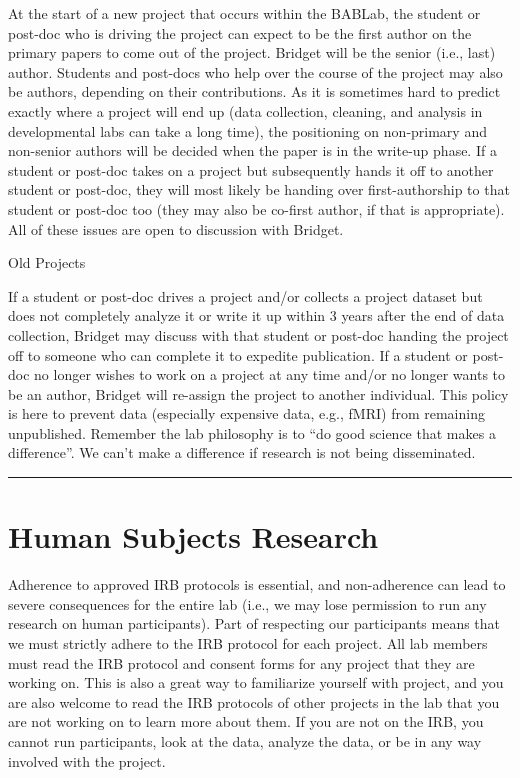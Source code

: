 \documentclass[]{book}
\begin{document}
At the start of a new project that occurs within the BABLab, the student or post-doc who is driving the project can expect to be the first author on the primary papers to come out of the project. Bridget will be the senior (i.e., last) author. Students and post-docs who help over the course of the project may also be authors, depending on their contributions. As it is sometimes hard to predict exactly where a project will end up (data collection, cleaning, and analysis in developmental labs can take a long time), the positioning on non-primary and non-senior authors will be decided when the paper is in the write-up phase. If a student or post-doc takes on a project but subsequently hands it off to another student or post-doc, they will most likely be handing over first-authorship to that student or post-doc too (they may also be co-first author, if that is appropriate). All of these issues are open to discussion with Bridget.

Old Projects

If a student or post-doc drives a project and/or collects a project dataset but does not completely analyze it or write it up within 3 years after the end of data collection, Bridget may discuss with that student or post-doc handing the project off to someone who can complete it to expedite publication. If a student or post-doc no longer wishes to work on a project at any time and/or no longer wants to be an author, Bridget will re-assign the project to another individual. This policy is here to prevent data (especially expensive data, e.g., fMRI) from remaining unpublished. Remember the lab philosophy is to ``do good science that makes a difference''. We can't make a difference if research is not being disseminated.

\begin{center}\rule{0.5\linewidth}{0.5pt}\end{center}

\hypertarget{human-subjects-research}{%
\section{Human Subjects Research}\label{human-subjects-research}}

Adherence to approved IRB protocols is essential, and non-adherence can lead to severe consequences for the entire lab (i.e., we may lose permission to run any research on human participants). Part of respecting our participants means that we must strictly adhere to the IRB protocol for each project. All lab members must read the IRB protocol and consent forms for any project that they are working on. This is also a great way to familiarize yourself with project, and you are also welcome to read the IRB protocols of other projects in the lab that you are not working on to learn more about them. If you are not on the IRB, you cannot run participants, look at the data, analyze the data, or be in any way involved with the project.
\end{document}
